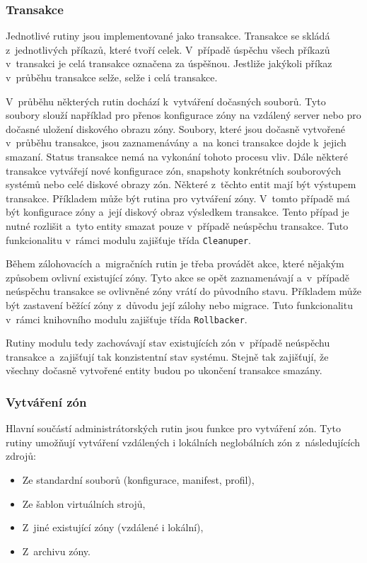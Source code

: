 \subsubsection{Transakce}
\label{chapter:implementation:szones:routines:transaction}
Jednotlivé rutiny jsou implementované jako transakce. Transakce se skládá z~jednotlivých příkazů, které tvoří
celek. V~případě úspěchu všech příkazů v~transakci je celá transakce označena za úspěšnou. Jestliže jakýkoli příkaz v~průběhu
transakce selže, selže i celá transakce.

V~průběhu některých rutin dochází k~vytváření dočasných souborů. Tyto soubory slouží například pro přenos konfigurace zóny
na vzdálený server nebo pro dočasné uložení diskového obrazu zóny. Soubory, které jsou dočasně vytvořené v~průběhu transakce, jsou
zaznamenávány a~na konci transakce dojde k~jejich smazaní. Status transakce nemá na vykonání tohoto procesu vliv.
Dále některé transakce vytvářejí nové konfigurace zón, snapshoty konkrétních souborových systémů nebo celé diskové obrazy zón. 
Některé z~těchto entit mají být výstupem transakce. Příkladem může být rutina pro vytváření zóny. V~tomto případě 
má být konfigurace zóny a~její diskový obraz výsledkem transakce. Tento případ je nutné rozlišit a~tyto entity smazat pouze 
v~případě neúspěchu transakce. Tuto funkcionalitu v~rámci modulu zajišťuje třída \verb|Cleanuper|.

Během zálohovacích a~migračních rutin je třeba provádět akce, které nějakým způsobem ovlivní existující zóny. Tyto akce se opět
zaznamenávají a~v~případě neúspěchu transakce se ovlivněné zóny vrátí do původního stavu. Příkladem může být zastavení běžící
zóny z~důvodu její zálohy nebo migrace. Tuto funkcionalitu v~rámci knihovního modulu zajišťuje třída \verb|Rollbacker|.

Rutiny modulu tedy zachovávají stav existujících zón v~případě neúspěchu transakce a~zajišťují tak konzistentní stav systému. Stejně
tak zajišťují, že všechny dočasně vytvořené entity budou po ukončení transakce smazány.
\subsubsection{Vytváření zón}
\label{chapter:implementation:szones:routines:creation}
Hlavní součástí administrátorských rutin jsou funkce pro vytváření zón. Tyto rutiny umožňují vytváření vzdálených i
lokálních neglobálních zón z~následujících zdrojů:
\begin{itemize}
 \item Ze standardní souborů (konfigurace, manifest, profil),
 \item Ze šablon virtuálních strojů,
 \item Z~jiné existující zóny (vzdálené i lokální),
 \item Z~archivu zóny.
\end{itemize}

